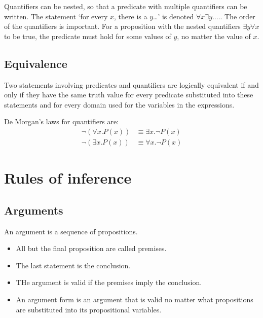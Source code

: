 Quantifiers can be nested, so that a predicate with multiple quantifiers can be written. The statement `for every \(x\), there is a \(y\)\dots' is denoted \(\forall x \exists y. \dots\). The order of the quantifiers is important. For a proposition with the nested quantifiers \(\exists y \forall x\) to be true, the predicate must hold for some values of \(y\), no matter the value of \(x\).

\subsection{Equivalence}
Two statements involving predicates and quantifiers are logically equivalent if and only if they have the same truth value for every predicate substituted into these statements and for every domain used for the variables in the expressions.

De Morgan's laws for quantifiers are:
\begin{align*}
    \neg(\forall x. P(x)) & \equiv \exists x. \neg P(x) \\
    \neg(\exists x. P(x)) & \equiv \forall x. \neg P(x)
\end{align*}

\section{Rules of inference}
\subsection{Arguments}
An argument is a sequence of propositions.
\begin{itemize}
    \item All but the final proposition are called premises.
    \item The last statement is the conclusion.
    \item THe argument is valid if the premises imply the conclusion.
    \item An argument form is an argument that is valid no matter what propositions are substituted into its propositional variables.
\end{itemize}

